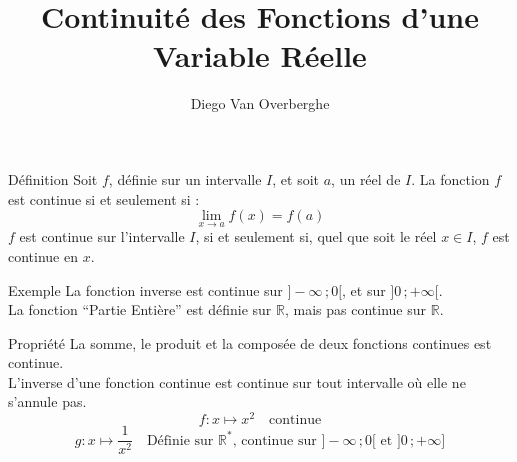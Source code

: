 \documentclass{cours}
\title{Continuité des Fonctions d'une \\ Variable Réelle}
\author{Diego Van Overberghe}
\begin{document}

    \begin{Gpartie}{Définition}
        Soit $f$, définie sur un intervalle $I$, et soit $a$, un réel de $I$.
        La fonction $f$ est continue si et seulement si : \[\lim_{x \to a} f(x)=f(a)\]
        $f$ est continue sur l'intervalle $I$, si et seulement si, quel que soit le réel $x\in I$, $f$ est continue en $x$.

        \begin{Spartie}{Exemple}
            La fonction inverse est continue sur $\big]-\infty\,;0\big[$, et sur $\big]0\,;+\infty\big[$.\\
            La fonction ``Partie Entière'' est définie sur $\mathbb{R}$, mais pas continue sur $\mathbb{R}$. \\[2ex]
            \begin{center}\end{center}
            \parbox{\linewidth}{\captionof{figure}{\centering Représentation Graphique de la Fonction \linebreak ``Partie Entière'', continue sur $\big[n\,;n+1\big[$ avec $n\in\mathbb{Z}$.}}
            \begin{center}\end{center}
            \parbox{\linewidth}{}
        \end{Spartie}

        \begin{Spartie}{Propriété}
            La somme, le produit et la composée de deux fonctions continues est continue. \\
            L'inverse d'une fonction continue est continue sur tout intervalle où elle ne s'annule pas.
            \[f : x\mapsto x^2\quad\text{continue}\] \[g : x\mapsto\dfrac{1}{x^2}\quad\text{Définie sur }\mathbb{R}^*\text{, continue sur }\big]-\infty\,;0\big[\text{ et }\big]0\,;+\infty\big]\]
        \end{Spartie}
    \end{Gpartie}
\end{document}
